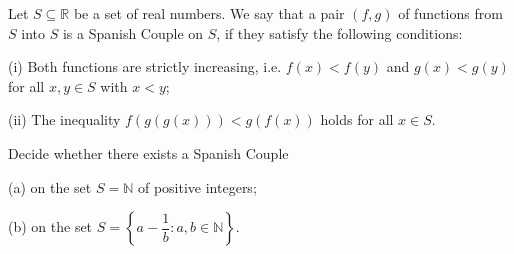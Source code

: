 Let $S \subseteq \mathbb{R}$ be a set of real numbers. We say that a pair $(f, g)$ of functions from $S$ into $S$ is a Spanish Couple on $S$, if they satisfy the following conditions:

(i) Both functions are strictly increasing, i.e. $f(x) < f(y)$ and $g(x) < g(y)$ for all $x, y \in S$ with $x < y$;

(ii) The inequality $f(g(g(x))) < g(f(x))$ holds for all $x \in S$.

Decide whether there exists a Spanish Couple

(a) on the set $S = \mathbb{N}$ of positive integers;

(b) on the set $S = \left\{ a - \dfrac{1}{b} : a, b \in \mathbb{N} \right\}$.
